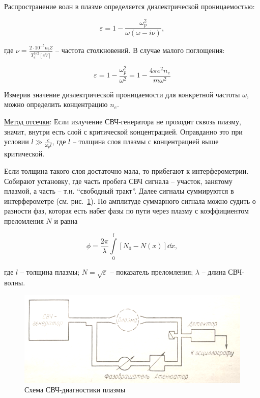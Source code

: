 \documentclass[10pt, a4paper]{article}
\begin{document}
Распространение волн в плазме определяется диэлектрической проницаемостью:

\begin{equation*}
	\varepsilon = 1-\frac{\omega_p^2}{\omega(\omega-i\nu)},
\end{equation*}

где $\nu=\frac{2\cdot10^{-5} n_i Z}{T_e^{3/2}[eV]}$ -- частота столкновений. В случае малого поглощения:

\begin{equation*}
	\varepsilon = 1 - \frac{\omega_p^2}{\omega^2} = 1 - \frac{4\pi e^2n_e}{m\omega^2} 
\end{equation*}

Измерив значение диэлектрической проницаемости для конкретной частоты $\omega$, можно определить концентрацию $n_e$.

\uline{Метод отсечки}: Если излучение СВЧ-генератора не проходит сквозь плазму, значит, внутри есть слой с критической концентрацией. Оправданно это при условии $l \gg \frac{c}{\omega_pl}$, где $l$ -- толщина слоя плазмы с концентрацией выше критической.

Если толщина такого слоя достаточно мала, то прибегают к интерферометрии. Собирают установку, где часть пробега СВЧ сигнала -- участок, занятому плазмой, а часть -- т.н. ``свободный тракт''. Далее сигналы суммируются в интерферометре (см. рис.~\ref{fig:microwave_diagnostics}). По амплитуде суммарного сигнала можно судить о разности фаз, которая есть набег фазы по пути через плазму с коэффициентом преломления $N$ и равна

\begin{equation}
	\phi = \frac{2\pi}{\lambda}\int\limits_0^l[N_0-N(x)]\dd{x},
\end{equation} 

где $l$ -- толщина плазмы; $N=\sqrt{\varepsilon}$ -- показатель преломления; $\lambda$ -- длина СВЧ-волны.

\begin{figure}[ht]
	\begin{center}
		\includegraphics[width = 0.5\linewidth]{microwave_diagnostics}
	\end{center}
	\caption{Схема СВЧ-диагностики плазмы}
	\label{fig:microwave_diagnostics}
\end{figure}
\end{document}
